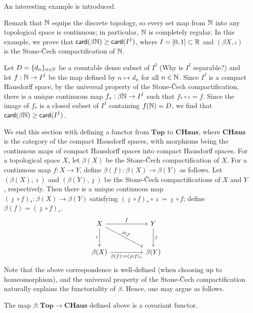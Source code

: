 An interesting example is introduced.
\begin{exmp}
    Remark that ${\mathbb{N}}$ equips the discrete topology, so every set map from ${\mathbb{N}}$ into any topological space is continuous; in particular, ${\mathbb{N}}$ is completely regular.
    In this example, we prove that $\textsf{card}({\beta{\mathbb{N}}})\geq\textsf{card}({I^I})$, where $I=[0, 1]\subset{\mathbb{R}}$ and $(\beta X, \iota)$ is the Stone-\v{C}ech compactification of ${\mathbb{N}}$.
    
    Let $D=\{d_n\}_{n\in{\mathbb{N}}}$ be a countable dense subset of $I^I$ \color{brown}(Why is $I^I$ separable?) \color{black} and let $f: {\mathbb{N}}\rightarrow I^I$ be the map defined by $n\mapsto d_n$ for all $n\in{\mathbb{N}}$.
    Since $I^I$ is a compact Hausdorff space, by the universal property of the Stone-\v{C}ech compactification, there is a unique continuous map $f_*: \beta{\mathbb{N}}\rightarrow I^I$ such that $f_*\circ\iota=f$.
    Since the image of $f_*$ is a closed subset of $I^I$ containing $f({\mathbb{N}})=D$, we find that $\textsf{card}({\beta{\mathbb{N}}})\geq\textsf{card}({I^I})$.
\end{exmp}

We end this section with defining a functor from $\textbf{Top}$ to $\textbf{CHaus}$, where $\textbf{CHaus}$ is the category of the compact Hausdorff spaces, with morphisms being the continuous maps of compact Hausdorff spaces into compact Hausdorff spaces.
For a topological space $X$, let $\beta(X)$ be the Stone-\v{C}ech compactification of $X$.
For a continuous map $f: X\rightarrow Y$, define $\beta(f): \beta(X)\rightarrow\beta(Y)$ as follows.
Let $(\beta(X), \imath)$ and $(\beta(Y), \jmath)$ be the Stone-\v{C}ech compactifications of $X$ and $Y$, respectively.
Then there is a unique continuous map $(\jmath\circ f)_*: \beta(X)\rightarrow\beta(Y)$ satisfying $(\jmath\circ f)_*\circ\imath=\jmath\circ f$; define $\beta(f)=(\jmath\circ f)_*$.
\begin{equation*}
\begin{tikzcd}[row sep=large, column sep=huge]
    X
    \arrow[r, "f"]
    \arrow[d, "\imath"']
    \arrow[dr, "\jmath\circ f"{sloped}]
    &
    Y
    \arrow[d, "\jmath"]
    \\
    \beta(X)
    \arrow[r, "\beta(f):=(\jmath\circ f)_*"']
    &
    \beta(Y)
\end{tikzcd}
\end{equation*}
Note that the above correspondence is well-defined (when choosing up to homeomorphism), and the universal property of the Stone-\v{C}ech compactification naturally explains the functoriality of $\beta$.
Hence, one may argue as follows.
\begin{prop}
    The map $\beta: \textbf{Top}\rightarrow\textbf{CHaus}$ defined above is a covariant functor.
\end{prop}